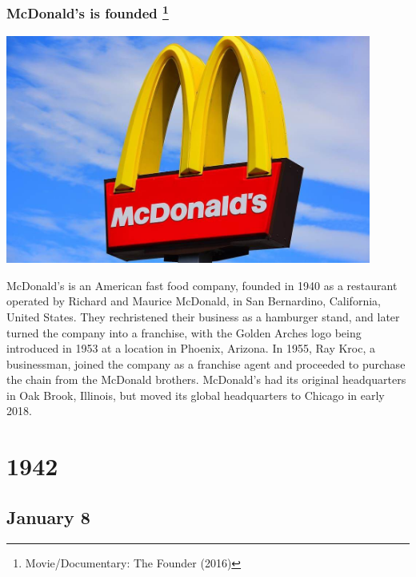 \documentclass[11pt]{report}
\begin{document}
\subsection{McDonald's is founded \protect\footnote{Movie/Documentary: The Founder (2016)}}
\vspace{2mm}\begin{center}\includegraphics[width=12cm]{./img/mcdonalds.jpg}\end{center}
McDonald's is an American fast food company, founded in 1940 as a restaurant operated by Richard and Maurice McDonald, in San Bernardino, California, United States. They rechristened their business as a hamburger stand, and later turned the company into a franchise, with the Golden Arches logo being introduced in 1953 at a location in Phoenix, Arizona. In 1955, Ray Kroc, a businessman, joined the company as a franchise agent and proceeded to purchase the chain from the McDonald brothers. McDonald's had its original headquarters in Oak Brook, Illinois, but moved its global headquarters to Chicago in early 2018.

\chapter{1942}
\section{January 8}
\end{document}
